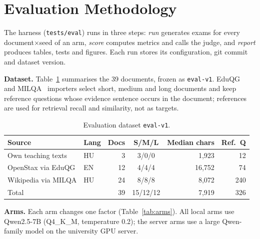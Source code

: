 \documentclass[conference]{IEEEtran}
\begin{document}
\section{Evaluation Methodology}
\label{sec:eval}

The harness (\texttt{tests/eval}) runs in three steps: \emph{run} generates exams for every
document$\times$seed of an arm, \emph{score} computes metrics and calls the judge, and \emph{report}
produces tables, tests and figures. Each run stores its configuration, git commit and dataset version.

\textbf{Dataset.} Table~\ref{tab:dataset} summarises the 39 documents, frozen as \texttt{eval-v1}.
EduQG~\cite{hadifar2023eduqg} and MILQA~\cite{novak2023milqa} importers select short, medium and long
documents and keep reference questions whose evidence sentence occurs in the document; references are
used for retrieval recall and similarity, not as targets.

\begin{table}[t]
\centering
\caption{Evaluation dataset \texttt{eval-v1}.}
\label{tab:dataset}
\footnotesize
\setlength{\tabcolsep}{3.5pt}
\begin{tabular}{@{}llrcrr@{}}
\toprule
Source & Lang & Docs & S/M/L & Median chars & Ref.\ Q \\
\midrule
Own teaching texts & HU & 3 & 3/0/0 & 1{,}923 & 12 \\
OpenStax via EduQG & EN & 12 & 4/4/4 & 16{,}752 & 74 \\
Wikipedia via MILQA & HU & 24 & 8/8/8 & 8{,}072 & 240 \\
\midrule
Total & & 39 & 15/12/12 & 7{,}919 & 326 \\
\bottomrule
\end{tabular}
\end{table}

\textbf{Arms.} Each arm changes one factor (Table~\ref{tab:arms}). All local arms use Qwen2.5-7B
(Q4\_K\_M, temperature 0.2); the server arms use a large Qwen-family model on the university GPU server.
\end{document}
